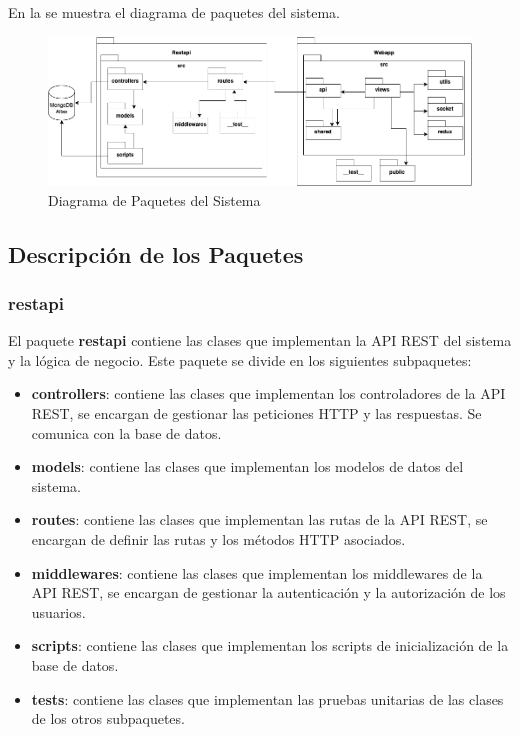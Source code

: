 En la  se muestra el diagrama de paquetes del sistema.
\begin{figure}[H]
    \hypertarget{fig:6_5_Diagrama-Paquetes}{}
    \centering
    \includegraphics[width=0.8\linewidth]{figures/6-Analisis/6-Clases/6_5-vista_general-paquetes.png}
    \caption{Diagrama de Paquetes del Sistema}
    \label{fig:6_5_Diagrama-Paquetes}
\end{figure}

\subsection{Descripción de los Paquetes}
\subsubsection{restapi}
El paquete \textbf{restapi} contiene las clases que implementan la API REST del sistema y la lógica de negocio. Este paquete se divide en los siguientes subpaquetes:
\begin{itemize}
    \item \textbf{controllers}: contiene las clases que implementan los controladores de la API REST, se encargan de gestionar las peticiones HTTP y las respuestas. Se comunica con la base de datos.
    \item \textbf{models}: contiene las clases que implementan los modelos de datos del sistema.
    \item \textbf{routes}: contiene las clases que implementan las rutas de la API REST, se encargan de definir las rutas y los métodos HTTP asociados.
    \item \textbf{middlewares}: contiene las clases que implementan los middlewares de la API REST, se encargan de gestionar la autenticación y la autorización de los usuarios.
    \item \textbf{scripts}: contiene las clases que implementan los scripts de inicialización de la base de datos.
    \item \textbf{tests}: contiene las clases que implementan las pruebas unitarias de las clases de los otros subpaquetes.
\end{itemize}


